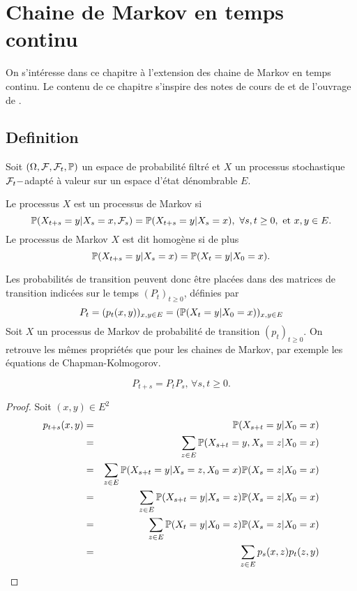 
\chapter{Chaine de Markov en temps continu}\label{chap:processus_markov}
On s'intéresse dans ce chapitre à l'extension des chaine de Markov en temps continu. Le contenu de ce chapitre s'inspire des notes de cours de \citet{Truquet_stat_proc} et de l'ouvrage de \citet{Dobrow2016}.
\section{Definition}
Soit $(\Omega, \mathcal{F},\mathcal{F}_t,\mathbb{P})$ un espace de probabilité filtré et $X$ un processus stochastique $\mathcal{F}_t-$adapté à valeur sur un espace d'état dénombrable $E$.
\begin{definition}
Le processus $X$ est un processus de Markov si 
$$
\mathbb{P}(X_{t+s} = y|X_s = x, \mathcal{F}_s) = \mathbb{P}(X_{t+s} = y|X_s = x),\text{ }\forall s,t\geq 0,\text{ et }x,y \in E.
$$
Le processus de Markov $X$ est dit homogène si de plus
$$
\mathbb{P}(X_{t+s} = y|X_s = x) = \mathbb{P}(X_{t} = y|X_0 = x).
$$
\end{definition} 
Les probabilités de transition peuvent donc être placées dans des matrices de transition indicées sur le temps $(P_t)_{t\geq 0}$, définies par 
$$
P_t = (p_t(x,y))_{x,y\in E} = (\mathbb{P}(X_t = y|X_0 = x))_{x,y\in E}
$$
Soit $X$ un processus de Markov de probabilité de transition $(p_t)_{t\geq0}$. On retrouve les mêmes propriétés que pour les chaines de Markov, par exemple les équations de Chapman-Kolmogorov.
\begin{prop}\label{prop:CK}
$$
P_{t+s} = P_{t}P_s\text{, }\forall s,t\geq0.
$$
\end{prop}
\begin{proof}
Soit $(x,y)\in E^2$
\begin{eqnarray*}
p_{t+s}(x,y) &=& \mathbb{P}(X_{s+t} = y|X_0 = x)\\
&=&\sum_{z\in E}\mathbb{P}(X_{s+t} = y,X_{s} = z|X_0 = x)\\
&=&\sum_{z\in E}\mathbb{P}(X_{s+t} = y|X_{s} = z,X_0 = x)\mathbb{P}(X_{s} = z|X_0 = x)\\
&=&\sum_{z\in E}\mathbb{P}(X_{s+t} = y|X_{s} = z)\mathbb{P}(X_{s} = z|X_0 = x)\\
&=&\sum_{z\in E}\mathbb{P}(X_{t} = y|X_{0} = z)\mathbb{P}(X_{s} = z|X_0 = x)\\
&=&\sum_{z\in E}p_s(x,z)p_t(z,y)\\
\end{eqnarray*}
\end{proof}
